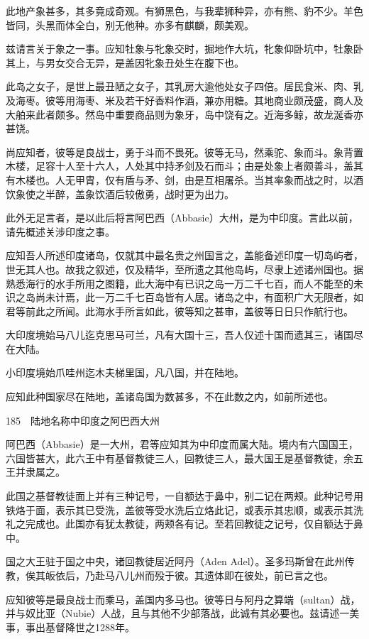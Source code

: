\documentclass[12pt,UTF8]{ctexbook}
\begin{document}
此地产象甚多，其多竟成奇观。有狮黑色，与我辈狮种异，亦有熊、豹不少。羊色皆同，头黑而体全白，别无他种。亦多有麒麟，颇美观。

兹请言关于象之一事。应知牡象与牝象交时，掘地作大坑，牝象仰卧坑中，牡象卧其上，与男女交合无异，是盖因牝象丑处生在腹下也。

此岛之女子，是世上最丑陋之女子，其乳房大逾他处女子四倍。居民食米、肉、乳及海枣。彼等用海枣、米及若干好香料作酒，兼亦用糖。其地商业颇茂盛，商人及大舶来此者颇多。然岛中重要商品则为象牙，岛中饶有之。近海多鲸，故龙涎香亦甚饶。

尚应知者，彼等是良战士，勇于斗而不畏死。彼等无马，然乘驼、象而斗。象背置木楼，足容十人至十六人，人处其中持矛剑及石而斗；由是处象上者颇善斗，盖其有木楼也。人无甲胄，仅有盾与矛、剑，由是互相屠杀。当其率象而战之时，以酒饮象使之半醉，盖象饮酒后较傲勇，战时更为出力。

此外无足言者，是以此后将言阿巴西（Abbasie）大州，是为中印度。言此以前，请先概述关涉印度之事。

应知吾人所述印度诸岛，仅就其中最名贵之州国言之，盖能备述印度一切岛屿者，世无其人也。故我之叙述，仅及精华，至所遗之其他岛屿，尽隶上述诸州国也。据熟悉海行的水手所用之图籍，此大海中有已识之岛一万二千七百，而人不能至的未识之岛尚未计焉，此一万二千七百岛皆有人居。诸岛之中，有面积广大无限者，如君等前此之所闻。此海水手所言如此，彼等知之甚审，盖彼等日日只作航行也。

大印度境始马八儿迄克思马可兰，凡有大国十三，吾人仅述十国而遗其三，诸国尽在大陆。

小印度境始爪哇州迄木夫梯里国，凡八国，并在陆地。

应知此种国家尽在陆地，盖诸岛国为数甚多，不在此数之内，如前所述也。





185　陆地名称中印度之阿巴西大州

阿巴西（Abbasie）是一大州，君等应知其为中印度而属大陆。境内有六国国王，六国皆甚大，此六王中有基督教徒三人，回教徒三人，最大国王是基督教徒，余五王并隶属之。

此国之基督教徒面上并有三种记号，一自额达于鼻中，别二记在两颊。此种记号用铁烙于面，表示其已受洗，盖彼等受水洗后立烙此记，或表示其忠顺，或表示其洗礼之完成也。此国亦有犹太教徒，两颊各有记。至若回教徒之记号，仅自额达于鼻中。

国之大王驻于国之中央，诸回教徒居近阿丹（Aden Adel）。圣多玛斯曾在此州传教，俟其皈依后，乃赴马八儿州而殁于彼。其遗体即在彼处，前已言之也。

应知彼等是最良战士而乘马，盖国内多马也。彼等日与阿丹之算端（sultan）战，并与奴比亚（Nubie）人战，且与其他不少部落战，此诚有其必要也。兹请述一美事，事出基督降世之1288年。
\end{document}
